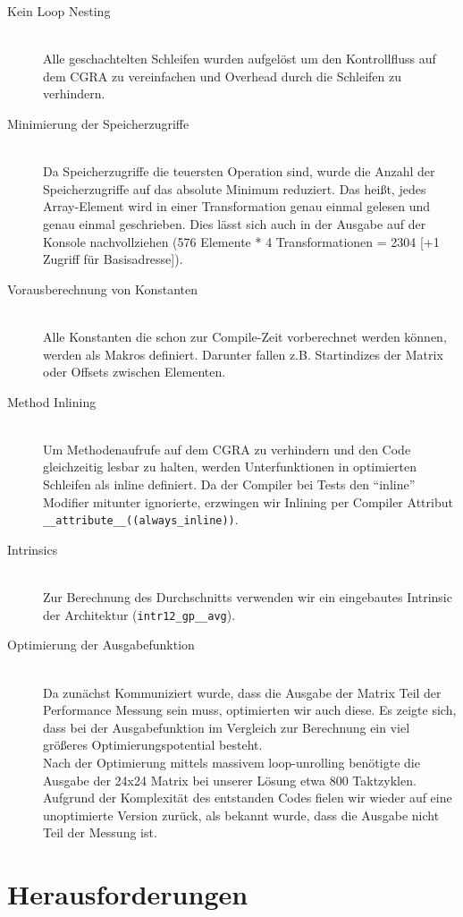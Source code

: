 \documentclass[oneside,11pt,accentcolor=tud2b, nochapname]{tudexercise}
\begin{document}
\begin{description}	
	\item[Kein Loop Nesting] \hfill \\
	Alle geschachtelten Schleifen wurden aufgelöst um den Kontrollfluss auf dem CGRA zu vereinfachen und Overhead durch die Schleifen zu verhindern.\\
	
	\item[Minimierung der Speicherzugriffe] \hfill \\
	Da Speicherzugriffe die teuersten Operation sind, wurde die Anzahl der Speicherzugriffe auf das absolute Minimum reduziert.
	Das heißt, jedes Array-Element wird in einer Transformation genau einmal gelesen und genau einmal geschrieben.
	Dies lässt sich auch in der Ausgabe auf der Konsole nachvollziehen (576 Elemente * 4 Transformationen = 2304 [+1 Zugriff für Basisadresse]).\\
	
	\item[Vorausberechnung von Konstanten] \hfill \\
	Alle Konstanten die schon zur Compile-Zeit vorberechnet werden können, werden als Makros definiert. 
	Darunter fallen z.B. Startindizes der Matrix oder Offsets zwischen Elementen.\\
	
	\item[Method Inlining] \hfill \\
	Um Methodenaufrufe auf dem CGRA zu verhindern und den Code gleichzeitig lesbar zu halten, werden Unterfunktionen in optimierten Schleifen als inline definiert.
	Da der Compiler bei Tests den "`inline"' Modifier mitunter ignorierte, erzwingen wir  Inlining per Compiler Attribut \texttt{\_\_attribute\_\_((always\_inline))}.\\
	
	\item[Intrinsics] \hfill \\
	Zur Berechnung des Durchschnitts verwenden wir ein eingebautes Intrinsic der Architektur (\texttt{intr12\_gp\_\_avg}).\\
	
	\item[Optimierung der Ausgabefunktion] \hfill \\
	Da zunächst Kommuniziert wurde, dass die Ausgabe der Matrix Teil der Performance Messung sein muss, optimierten wir auch diese.
	Es zeigte sich, dass bei der Ausgabefunktion im Vergleich zur Berechnung ein viel größeres Optimierungspotential besteht.\\
	Nach der Optimierung mittels massivem loop-unrolling benötigte die Ausgabe der 24x24 Matrix bei unserer Lösung etwa 800 Taktzyklen.
	Aufgrund der Komplexität des entstanden Codes fielen wir wieder auf eine unoptimierte Version zurück, als bekannt wurde, dass die Ausgabe nicht Teil der Messung ist.
	
\end{description}


\section*{Herausforderungen}
\end{document}
